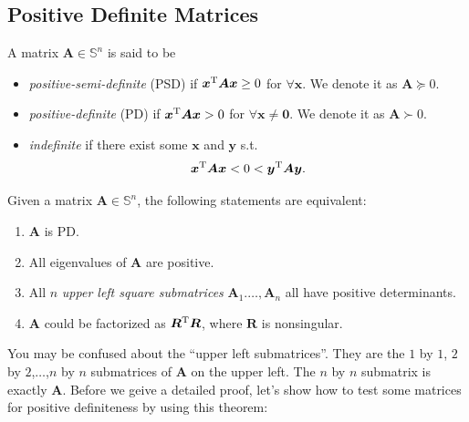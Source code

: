 \subsection{Positive Definite Matrices}
\begin{definition} A matrix $\bm A\in\mathbb{S}^n$ is said to be
\begin{itemize}
\item
\textit{positive-semi-definite} (PSD) if $\bm x^{\mathrm T}\bm A\bm x\ge0$ for $\forall\bm x.$ We denote it as $\bm A\succeq0.$
\item
 \textit{positive-definite} (PD) if $\bm x^{\mathrm T}\bm A\bm x>0$ for $\forall\bm x\ne\bm 0.$ We denote it as $\bm A\succ0.$
\item
\textit{indefinite} if there exist some $\bm x$ and $\bm y$ s.t.
\[
\bm x^{\mathrm T}\bm A\bm x<0<\bm y^{\mathrm T}\bm A\bm y.
\]
\end{itemize}
\end{definition}
\begin{theorem}\label{PD_theorem}
Given a matrix $\bm A\in\mathbb{S}^n$, the following statements are equivalent:
\begin{enumerate}
\item
$\bm A$ is PD.
\item
All eigenvalues of $\bm A$ are positive.
\item
All $n$ \textit{upper left square submatrices} $\bm A_1.\dots,\bm A_n$ all have positive determinants.
\item
$\bm A$ could be factorized as $\bm R^{\mathrm T}\bm R$, where $\bm R$ is nonsingular.
\end{enumerate}
\end{theorem}
You may be confused about the ``upper left submatrices''. They are the $1$ by $1$, $2$ by $2$,$\dots$,$n$ by $n$ submatrices of $\bm A$ on the upper left. The $n$ by $n$ submatrix is exactly $\bm A$. Before we geive a detailed proof, let's show how to test some matrices for positive definiteness by using this theorem:
